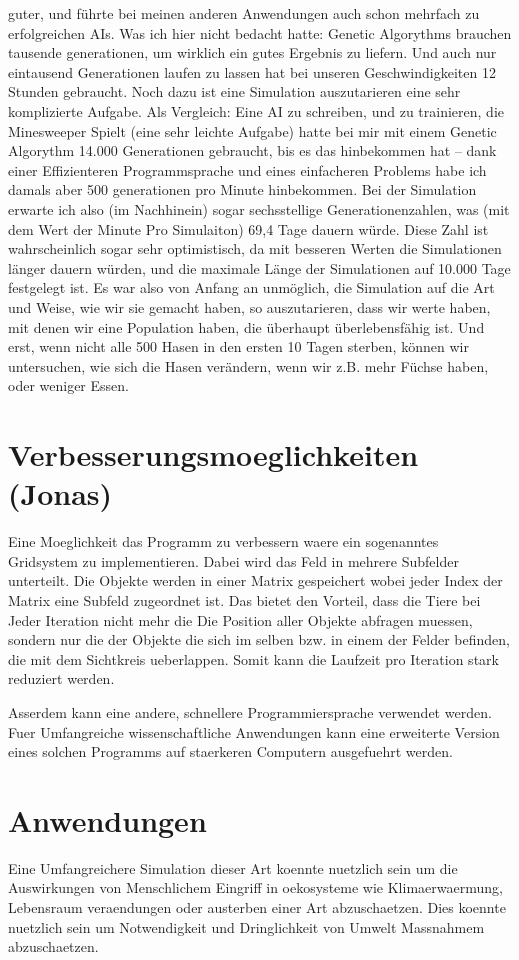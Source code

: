 \documentclass[12pt]{article}
\begin{document}
guter, und führte bei meinen anderen Anwendungen auch schon mehrfach zu
erfolgreichen AIs. Was ich hier nicht bedacht hatte: Genetic Algorythms brauchen
tausende generationen, um wirklich ein gutes Ergebnis zu liefern. Und auch nur
eintausend Generationen laufen zu lassen hat bei unseren Geschwindigkeiten 12 Stunden
gebraucht. Noch dazu ist eine Simulation auszutarieren eine sehr komplizierte Aufgabe.
Als Vergleich: Eine AI zu schreiben, und zu trainieren, die Minesweeper Spielt (eine
sehr leichte Aufgabe) hatte bei mir mit einem Genetic Algorythm 14.000 Generationen
gebraucht, bis es das hinbekommen hat – dank einer Effizienteren Programmsprache und
eines einfacheren Problems habe ich damals aber 500 generationen pro Minute
hinbekommen. Bei der Simulation erwarte ich also (im Nachhinein) sogar sechsstellige
Generationenzahlen, was (mit dem Wert der Minute Pro Simulaiton) 69,4 Tage dauern
würde. Diese Zahl ist wahrscheinlich sogar sehr optimistisch, da mit besseren Werten die
Simulationen länger dauern würden, und die maximale Länge der Simulationen auf
10.000 Tage festgelegt ist. Es war also von Anfang an unmöglich, die Simulation auf die
Art und Weise, wie wir sie gemacht haben, so auszutarieren, dass wir werte haben, mit
denen wir eine Population haben, die überhaupt überlebensfähig ist. Und erst, wenn
nicht alle 500 Hasen in den ersten 10 Tagen sterben, können wir untersuchen, wie sich
die Hasen verändern, wenn wir z.B. mehr Füchse haben, oder weniger Essen.


\section{Verbesserungsmoeglichkeiten (Jonas)}
Eine Moeglichkeit das Programm zu verbessern waere ein sogenanntes Gridsystem zu implementieren.
Dabei wird das Feld in mehrere Subfelder unterteilt.
Die Objekte werden in einer Matrix gespeichert wobei jeder Index der Matrix eine Subfeld zugeordnet ist.
Das bietet den Vorteil, dass die Tiere bei Jeder Iteration nicht mehr die Die
Position aller Objekte abfragen muessen, sondern nur die der Objekte die sich im
selben bzw. in einem der Felder befinden, die mit dem Sichtkreis ueberlappen.
Somit kann die Laufzeit pro Iteration stark reduziert werden.

Asserdem kann eine andere, schnellere Programmiersprache verwendet werden.
Fuer Umfangreiche wissenschaftliche Anwendungen kann eine erweiterte Version
eines solchen Programms auf staerkeren Computern ausgefuehrt werden.
\section{Anwendungen}
Eine Umfangreichere Simulation dieser Art koennte nuetzlich sein um die Auswirkungen von Menschlichem Eingriff in oekosysteme wie Klimaerwaermung, Lebensraum veraendungen oder austerben einer Art abzuschaetzen.
Dies koennte nuetzlich sein um Notwendigkeit und Dringlichkeit von Umwelt Massnahmem abzuschaetzen.
\end{document}
